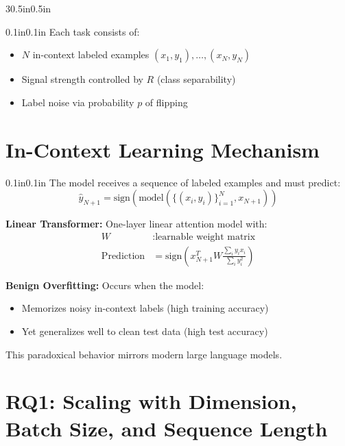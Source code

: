 \documentclass[article,36pt,extrafontsizes,oneside,openany,oldfontcommands]{memoir}
\begin{document}
\begin{adjmulticols*}{3}{0.5in}{0.5in}
\begin{adjustwidth}{0.1in}{0.1in}
\vspace{0.15in}
Each task consists of:
\begin{itemize}[topsep=0pt,itemsep=0ex,partopsep=1ex,parsep=1ex]
\item $N$ in-context labeled examples $(x_1, y_1), \ldots, (x_N, y_N)$
\item Signal strength controlled by $R$ (class separability)
\item Label noise via probability $p$ of flipping
\end{itemize}

\end{adjustwidth}

\columnbreak

\section{In-Context Learning Mechanism}

\begin{adjustwidth}{0.1in}{0.1in}
The model receives a sequence of labeled examples and must predict:
$$\hat{y}_{N+1} = \text{sign}(\text{model}(\{(x_i, y_i)\}_{i=1}^{N}, x_{N+1}))$$

\vspace{0.2in}
\textbf{Linear Transformer:} One-layer linear attention model with:
\begin{align*}
W &: \text{learnable weight matrix} \\
\text{Prediction} &= \text{sign}\left(x_{N+1}^T W \frac{\sum_i y_i x_i}{\sum_i y_i^2}\right)
\end{align*}

\vspace{0.2in}
\textbf{Benign Overfitting:} Occurs when the model:
\begin{itemize}[topsep=0pt,itemsep=0ex,partopsep=1ex,parsep=1ex]
\item Memorizes noisy in-context labels (high training accuracy)
\item Yet generalizes well to clean test data (high test accuracy)
\end{itemize}

This paradoxical behavior mirrors modern large language models.

\end{adjustwidth}

\section{RQ1: Scaling with Dimension, Batch Size, and Sequence Length}


\end{adjmulticols*}
\end{document}
